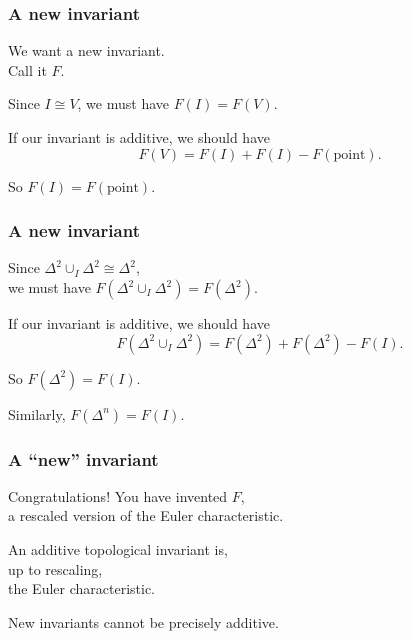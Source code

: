 \documentclass[14pt]{beamer}
\newcommand{\clearbackgroundpicture}{\usebackgroundtemplate{}}
\begin{document}
\clearbackgroundpicture{}

\begin{frame}
  \frametitle{A new invariant}

  We want a new invariant. \\
  Call it $F$.
  \pause
  
  Since $I \cong V$, we must have $F(I) = F(V)$.
  \pause

  If our invariant is additive, we should have
  $$
  F(V) = F(I) + F(I) - F(\mbox{point}).
  $$
  \pause

  So $F(I) = F(\mbox{point})$.

\end{frame}

\begin{frame}
  \frametitle{A new invariant}

  Since $\Delta^2 \cup_I \Delta^2 \cong \Delta^2$, \\
  we must have $F(\Delta^2 \cup_I \Delta^2 ) = F(\Delta^2)$.
  \pause

  If our invariant is additive, we should have
  $$
  F(\Delta^2 \cup_I \Delta^2) = F(\Delta^2) + F(\Delta^2) - F(I).
  $$
  \pause

  So $F(\Delta^2) = F(I)$. \\
  \pause

  Similarly, $F(\Delta^n) = F(I)$.

\end{frame}

\begin{frame}
  \frametitle{A \textcolor{red!50!black}{``new''} invariant}

  Congratulations!  \pause You have invented $F$, \pause\\
  a rescaled version of the Euler characteristic.
  \pause
  \vfill
  \begin{theorem}
    An additive topological invariant is, \\
    up to rescaling, \\
    the Euler characteristic.
  \end{theorem}
  \pause
  \vfill

  New invariants cannot be precisely additive.

  \vfill

\end{frame}
\end{document}
